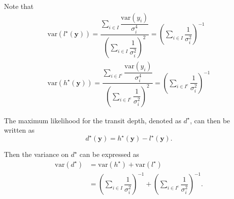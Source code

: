 \documentclass{article}
\begin{document}
Note that
\begin{align}
    \mathrm{var}\left(l^{\star}(\bm{y})\right) = \dfrac{\displaystyle\sum_{i \in I}\dfrac{\mathrm{var}(y_i)}{\sigma^4_i}}
    {\displaystyle\left(\sum_{i\in I}\dfrac{1}{\sigma^2_i}\right)^{2}}
    = \displaystyle\left(\sum_{i\in I}\dfrac{1}{\sigma^2_i}\right)^{-1}\\
    \mathrm{var}\left(h^{\star}(\bm{y})\right) = \dfrac{\displaystyle\sum_{i \in I^c}\dfrac{\mathrm{var}(y_i)}{\sigma^4_i}}
    {\displaystyle\left(\sum_{i\in I^c}\dfrac{1}{\sigma^2_i}\right)^{2}}
    = \displaystyle\left(\sum_{i\in I^c}\dfrac{1}{\sigma^2_i}\right)^{-1}
\end{align}

The maximum likelihood for the transit depth, denoted as $d^{\star}$, can then be written as
\begin{equation}
    d^{\star}(\bm{y}) = h^{\star}(\bm{y}) - l^{\star}(\bm{y}).
\end{equation}

Then the variance on $d^{\star}$ can be expressed as
\begin{align}
    \mathrm{var}\left(d^{\star}\right) &= \mathrm{var}\left(h^{\star}\right) + \mathrm{var}\left(l^{\star}\right)\\
    &= \displaystyle\left(\sum_{i\in I}\dfrac{1}{\sigma^2_i}\right)^{-1}
    + \displaystyle\left(\sum_{i\in I^c}\dfrac{1}{\sigma^2_i}\right)^{-1}.
\end{align}
\end{document}
